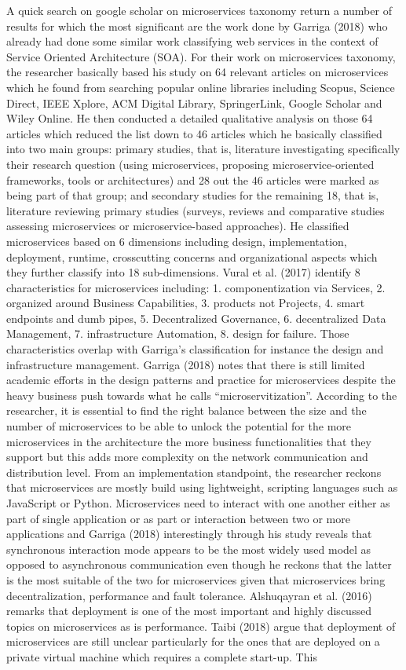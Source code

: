\documentclass{article}
\begin{document}
A quick search on google scholar on microservices taxonomy return a number of results for which the most significant are the work done by Garriga (2018) who already had done some similar work classifying web services in the context of Service Oriented Architecture (SOA). For their work on microservices taxonomy, the researcher basically based his study on 64 relevant articles on microservices which he found from searching popular online libraries including Scopus, Science Direct, IEEE Xplore, ACM Digital Library, SpringerLink, Google Scholar and Wiley Online. He then conducted a detailed qualitative analysis on those 64 articles which reduced the list down to 46 articles which he basically classified into two main groups: primary studies, that is, literature investigating specifically their research question (using microservices, proposing microservice-oriented frameworks, tools or architectures) and 28 out the 46 articles were marked as being part of that group; and secondary studies for the remaining 18, that is, literature reviewing primary studies (surveys, reviews and comparative studies assessing microservices or microservice-based approaches). He classified microservices based on 6 dimensions including design, implementation, deployment, runtime, crosscutting concerns and organizational aspects which they further classify into 18 sub-dimensions. Vural et al. (2017) identify 8 characteristics for microservices including: 1. componentization via Services, 2. organized around Business Capabilities, 3. products not Projects, 4. smart endpoints and dumb pipes, 5. Decentralized Governance, 6. decentralized Data Management, 7. infrastructure Automation, 8. design for failure. Those characteristics overlap with Garriga’s classification for instance the design and infrastructure management. Garriga (2018) notes that there is still limited academic efforts in the design patterns and practice for microservices despite the heavy business push towards what he calls “microservitization”. According to the researcher, it is essential to find the right balance between the size and the number of microservices to be able to unlock the potential for the more microservices in the architecture the more business functionalities that they support but this adds more complexity on the network communication and distribution level. From an implementation standpoint, the researcher reckons that microservices are mostly build using lightweight, scripting languages such as JavaScript or Python. Microservices need to interact with one another either as part of single application or as part or interaction between two or more applications and Garriga (2018) interestingly through his study reveals that synchronous interaction mode appears to be the most widely used model as opposed to asynchronous communication even though he reckons that the latter is the most suitable of the two for microservices given that microservices bring decentralization, performance and fault tolerance. Alshuqayran et al. (2016) remarks that deployment is one of the most important and highly discussed topics on microservices as is performance. Taibi (2018) argue that deployment of microservices are still unclear particularly for the ones that are deployed on a private virtual machine which requires a complete start-up. This 
\end{document}
